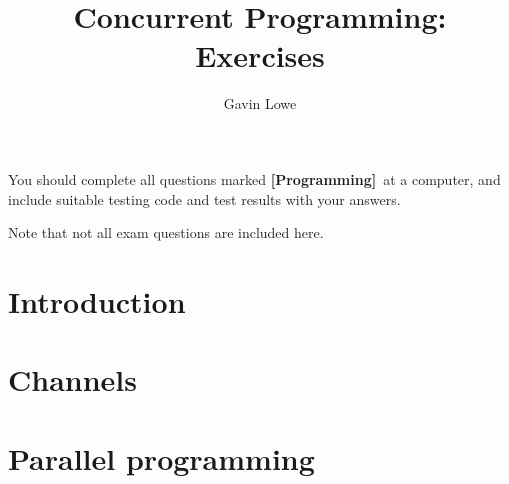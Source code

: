 \documentclass[fleqn,12pt]{article}
\title{Concurrent Programming: Exercises}
\author{Gavin Lowe}
\def\Programming{\textbf{[Programming]}}
\begin{document}
\maketitle

You should complete all questions marked \Programming\ at a computer, and
include suitable testing code and test results with your answers.

Note that not all exam questions are included here.


\section{Introduction}

















\section{Channels}







\section{Parallel programming}
\end{document}
